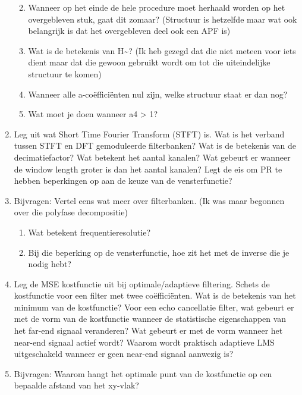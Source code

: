 \documentclass[
  a4paper,
  ,captions=tableheading
]{scrartcl}
\providecommand{\tightlist}{%
  \setlength{\itemsep}{0pt}\setlength{\parskip}{0pt}}
\begin{document}
\begin{enumerate}
  \begin{enumerate}
  \def\labelenumii{\arabic{enumii}.}
  \tightlist
  \item
    Wanneer op het einde de hele procedure moet herhaald worden op het
    overgebleven stuk, gaat dit zomaar? (Structuur is hetzelfde maar wat
    ook belangrijk is dat het overgebleven deel ook een APF is)\\
  \item
    Wat is de betekenis van H\textasciitilde? (Ik heb gezegd dat die
    niet meteen voor iets dient maar dat die gewoon gebruikt wordt om
    tot die uiteindelijke structuur te komen)\\
  \item
    Wanneer alle a-coëfficiënten nul zijn, welke structuur staat er dan
    nog?\\
  \item
    Wat moet je doen wanneer \textbar a4\textbar{} \textgreater{} 1?\\
  \end{enumerate}
\item
  Leg uit wat Short Time Fourier Transform (STFT) is. Wat is het verband
  tussen STFT en DFT gemoduleerde filterbanken? Wat is de betekenis van
  de decimatiefactor? Wat betekent het aantal kanalen? Wat gebeurt er
  wanneer de window length groter is dan het aantal kanalen? Legt de eis
  om PR te hebben beperkingen op aan de keuze van de vensterfunctie?\\
\item
  Bijvragen: Vertel eens wat meer over filterbanken. (Ik was maar
  begonnen over die polyfase decompositie)

  \begin{enumerate}
  \def\labelenumii{\arabic{enumii}.}
  \tightlist
  \item
    Wat betekent frequentieresolutie?\\
  \item
    Bij die beperking op de vensterfunctie, hoe zit het met de inverse
    die je nodig hebt?\\
  \end{enumerate}
\item
  Leg de MSE kostfunctie uit bij optimale/adaptieve filtering. Schets de
  kostfunctie voor een filter met twee coëfficiënten. Wat is de
  betekenis van het minimum van de kostfunctie? Voor een echo
  cancellatie filter, wat gebeurt er met de vorm van de kostfunctie
  wanneer de statistische eigenschappen van het far-end signaal
  veranderen? Wat gebeurt er met de vorm wanneer het near-end signaal
  actief wordt? Waarom wordt praktisch adaptieve LMS uitgeschakeld
  wanneer er geen near-end signaal aanwezig is?\\
\item
  Bijvragen: Waarom hangt het optimale punt van de kostfunctie op een
  bepaalde afstand van het xy-vlak?


\end{enumerate}
\end{document}

